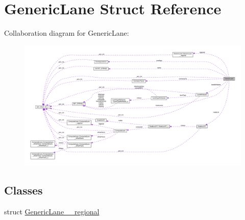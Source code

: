 \hypertarget{structGenericLane}{}\section{Generic\+Lane Struct Reference}
\label{structGenericLane}


Collaboration diagram for Generic\+Lane\+:\nopagebreak
\begin{figure}[H]
\begin{center}
\leavevmode
\includegraphics[width=350pt]{structGenericLane__coll__graph}
\end{center}
\end{figure}
\subsection*{Classes}
\begin{DoxyCompactItemize}
\item 
struct \hyperlink{structGenericLane_1_1GenericLane____regional}{Generic\+Lane\+\_\+\+\_\+regional}
\end{DoxyCompactItemize}

